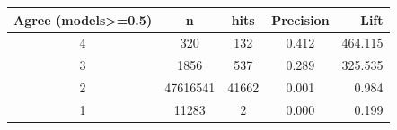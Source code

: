 \begin{tabular}{ccccr}
\toprule
Agree (models>=0.5) & n & hits & Precision & Lift \\
\midrule
4 & 320 & 132 & 0.412 & 464.115 \\
3 & 1856 & 537 & 0.289 & 325.535 \\
2 & 47616541 & 41662 & 0.001 & 0.984 \\
1 & 11283 & 2 & 0.000 & 0.199 \\
\bottomrule
\end{tabular}